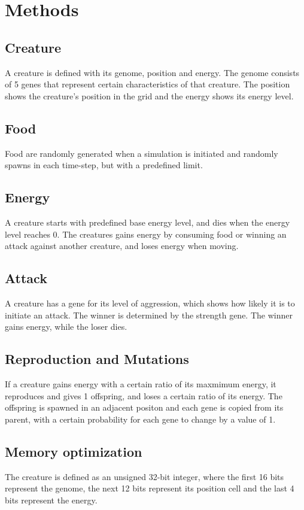 \documentclass{article}
\begin{document}
\newpage

\section{Methods}
\subsection{Creature}
A creature is defined with its genome, position and energy.
The genome consists of 5 genes that represent certain characteristics of that creature.
The position shows the creature's position in the grid and the energy shows its energy level.
\subsection{Food}
Food are randomly generated when a simulation is initiated and randomly spawns in each time-step, but with a predefined limit.
\subsection{Energy}
A creature starts with predefined base energy level, and dies when the energy level reaches 0.
The creatures gains energy by consuming food or winning an attack against another creature, and loses energy when moving.
\subsection{Attack}
A creature has a gene for its level of aggression, which shows how likely it is to initiate an attack.
The winner is determined by the strength gene. The winner gains energy, while the loser dies.
\subsection{Reproduction and Mutations}
If a creature gains energy with a certain ratio of its maxmimum energy, it reproduces and gives 1 offspring, and loses a certain ratio of its energy.
The offspring is spawned in an adjacent positon and each gene is copied from its parent, with a certain probability for each gene to change by a value of 1.
\subsection{Memory optimization}
The creature is defined as an unsigned 32-bit integer, where the first 16 bits represent the genome, the next 12 bits represent its position cell and the last 4 bits represent the energy.
\end{document}
